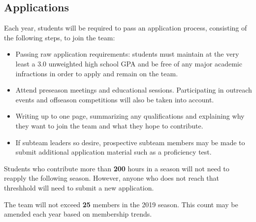 \documentclass{proc}
\begin{document}
\subsection{Applications}
Each year, students will be required to pass an application process, consisting of the following steps, to join the team:
\begin{itemize}
  \item{Passing raw application requirements: students must maintain at the very least a 3.0 unweighted high school GPA and be free of any major academic infractions in order to apply and remain on the team.}
  \item{Attend preseason meetings and educational sessions. Participating in outreach events and offseason competitions will also be taken into account.}
  \item{Writing up to one page, summarizing any qualifications and explaining why they want to join the team and what they hope to contribute.}
  \item{If subteam leaders so desire, prospective subteam members may be made to submit additional application material such as a proficiency test.}
\end{itemize}
Students who contribute more than \textbf{200} hours in a season will not need to reapply the following season. However, anyone who does not reach that threshhold will need to submit a new application.

The team will not exceed \textbf{25} members in the 2019 season. This count may be amended each year based on membership trends.
\end{document}
